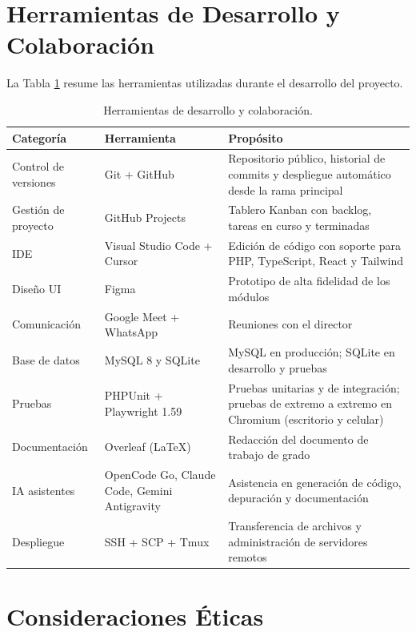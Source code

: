 \section{Herramientas de Desarrollo y Colaboración}
\label{sec:herramientas}

La Tabla \ref{tab:herramientas} resume las herramientas utilizadas durante el desarrollo del proyecto.

\begin{table}[!htbp]
\centering
\caption{Herramientas de desarrollo y colaboración.}
\label{tab:herramientas}
\small
\begin{tabular}{|l|p{4.2cm}|p{7.2cm}|}
\hline
\textbf{Categoría} & \textbf{Herramienta} & \textbf{Propósito} \\
\hline
Control de versiones & Git + GitHub & Repositorio público, historial de commits y despliegue automático desde la rama principal \\
\hline
Gestión de proyecto & GitHub Projects & Tablero Kanban con backlog, tareas en curso y terminadas \\
\hline
IDE & Visual Studio Code + Cursor & Edición de código con soporte para PHP, TypeScript, React y Tailwind \\
\hline
Diseño UI & Figma & Prototipo de alta fidelidad de los módulos \\
\hline
Comunicación & Google Meet + WhatsApp & Reuniones con el director \\
\hline
Base de datos & MySQL 8 y SQLite & MySQL en producción; SQLite en desarrollo y pruebas \\
\hline
Pruebas & PHPUnit + Playwright 1.59 & Pruebas unitarias y de integración; pruebas de extremo a extremo en Chromium (escritorio y celular) \\
\hline
Documentación & Overleaf (LaTeX) & Redacción del documento de trabajo de grado \\
\hline
IA asistentes & OpenCode Go, Claude Code, Gemini Antigravity & Asistencia en generación de código, depuración y documentación \\
\hline
Despliegue & SSH + SCP + Tmux & Transferencia de archivos y administración de servidores remotos \\
\hline
\end{tabular}
\end{table}

\section{Consideraciones Éticas}
\label{sec:etica}


